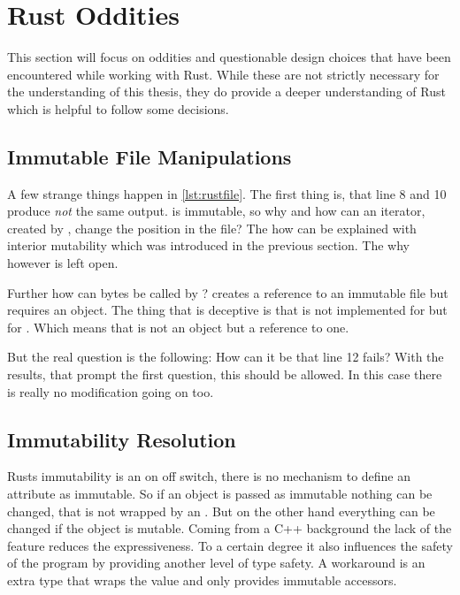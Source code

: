 \documentclass[thesis]{subfiles}
\begin{document}
\section{Rust Oddities}
  This section will focus on oddities and questionable design choices that have been encountered while working with Rust.
  While these are not strictly necessary for the understanding of this thesis, they do provide a deeper understanding of Rust which is helpful to follow some decisions.

  \subsection{Immutable File Manipulations}
    A few strange things happen in \autoref{lst:rustfile}.
    The first thing is, that line 8 and 10 produce \emph{not} the same output.
     is immutable, so why and how can an iterator, created by , change the position in the file?
    The how can be explained with interior mutability which was introduced in the previous section.
    The why however is left open.

    Further how can bytes be called by ?
     creates a reference to an immutable file but  requires an object.
    The thing that is deceptive is that \trait \Read is not implemented for \File but for .
    Which means that \self is not an object but a reference to one.

    But the real question is the following: How can it be that line 12 fails?
    With the results, that prompt the first question, this should be allowed.
    In this case there is really no modification going on too.


  \subsection{Immutability Resolution}
    Rusts immutability is an on off switch, there is no mechanism to define an attribute as immutable.
    So if an object is passed as immutable nothing can be changed, that is not wrapped by an \UnsafeCellT.
    But on the other hand everything can be changed if the object is mutable.
    Coming from a C++ background the lack of the  feature reduces the expressiveness.
    To a certain degree it also influences the safety of the program by providing another level of type safety\autocite[30ff.]{cpp101}.
    A workaround is an extra type that wraps the value and only provides immutable accessors.
\end{document}
